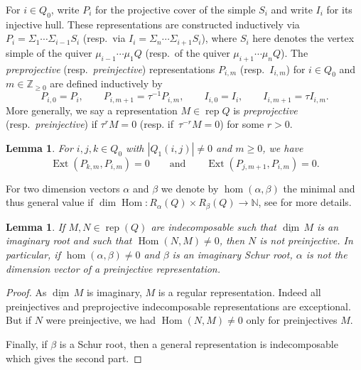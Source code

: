 \documentclass{amsart}
\newtheorem{lemma}[theorem]{Lemma}
\numberwithin{equation}{section}
\newcommand{\NN}{\mathbb{N}}
\newcommand{\ZZ}{\mathbb{Z}}
\newcommand\udim{{\underline{\dim}\, }}
\newcommand{\Ext}{\operatorname{Ext}}
\newcommand{\Hom}{\operatorname{Hom}}
\newcommand{\Irr}{\operatorname{Irr}}
\newcommand{\rep}{\operatorname{rep}}
\begin{document}
For $i\in Q_0$, write $P_i$ for the projective cover of the simple $S_i$ and write $I_i$ for its injective hull.
These representations are constructed inductively via $P_i=\Sigma_1\cdots\Sigma_{i-1}S_i$ (resp.~via $I_i=\Sigma_n\cdots\Sigma_{i+1}S_i$), where $S_i$ here denotes the vertex simple of the quiver $\mu_{i-1}\cdots\mu_1 Q$ (resp.~of the quiver $\mu_{i+1}\cdots\mu_n Q$).
The \emph{preprojective} (resp.~\emph{preinjective}) representations $P_{i,m}$ (resp.~$I_{i,m}$) for $i\in Q_0$ and $m\in\ZZ_{\ge0}$ are defined inductively by
\[P_{i,0}=P_i,\qquad P_{i,m+1}=\tau^{-1} P_{i,m},\qquad I_{i,0}=I_i,\qquad I_{i,m+1}=\tau I_{i,m}.\]
More generally, we say a representation $M\in\rep Q$ is \emph{preprojective} (resp.~\emph{preinjective}) if $\tau^r M=0$ (resp. if~$\tau^{-r} M=0$) for some $r>0$.

\begin{lemma}
  \label{le:preprojective ext groups}
  For $i,j,k\in Q_0$ with $|Q_1(i,j)|\ne0$ and $m\ge0$, we have 
  \[\Ext(P_{k,m},P_{i,m})=0 \qquad \text{and} \qquad \Ext(P_{j,m+1},P_{i,m})=0.\]
\end{lemma}
For two dimension vectors $\alpha$ and $\beta$ we denote by $\hom(\alpha,\beta)$ the minimal and thus general value if $\dim\Hom:R_\alpha(Q)\times R_\beta(Q)\to \NN$, see \cite{sch} for more details.
\begin{lemma}
  \label{lem: non-preinjective}
  If $M,N\in\rep(Q)$ are indecomposable such that $\udim M$ is an imaginary root and such that $\Hom(N,M)\neq 0$, then $N$ is not preinjective.
  In particular, if $\hom(\alpha,\beta)\neq 0$ and $\beta$ is an imaginary Schur root, $\alpha$ is not the dimension vector of a preinjective representation.
\end{lemma}
\begin{proof}
  As $\udim M$ is imaginary, $M$ is a regular representation.
  Indeed all preinjectives and preprojective indecomposable representations are exceptional.
  But if $N$ were preinjective, we had $\Hom(N,M)\neq 0$ only for preinjectives $M$.

  Finally, if $\beta$ is a Schur root, then a general representation is indecomposable which gives the second part.
\end{proof}
\end{document}
